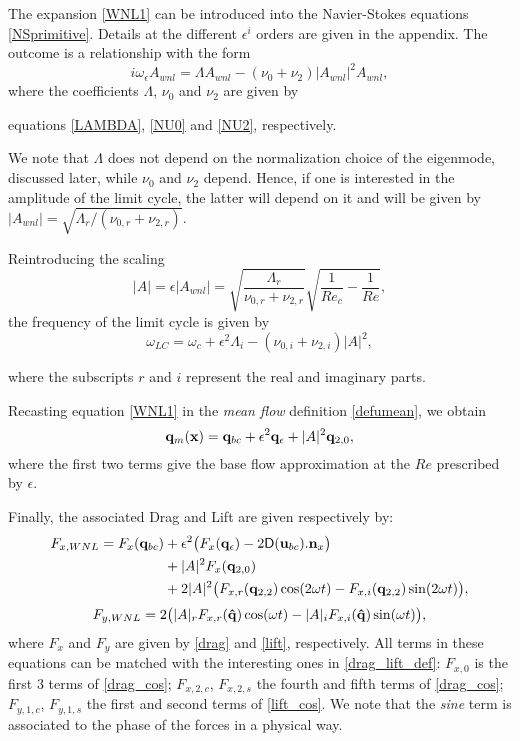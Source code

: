 \documentclass[twocolumn,10pt]{asme2ej}
\newcommand{\be}[1]{ \begin{equation} \label{#1}}
\newcommand{\ee}{\end{equation}}
\begin{document}
{\color{red}
The expansion \ref{WNL1} can be introduced into the Navier-Stokes equations \ref{NSprimitive}. Details at the different $\epsilon^i$ orders are given in the appendix}. The outcome is a relationship with the form
\be{WNL3}
i \omega_\epsilon A_{wnl} = \Lambda A_{wnl} - (\nu_0+\nu_2)  |A_{wnl}|^2 A_{wnl},
\ee
where the coefficients $\Lambda$, $\nu_0$ and $\nu_2$ are given by {\color{red}equations \ref{LAMBDA}, \ref{NU0} and \ref{NU2}, respectively.

We note that $\Lambda$ does not depend on the normalization choice of the eigenmode, discussed later, while $\nu_0$ and $\nu_2$ depend. Hence, if one is interested in the amplitude of the limit cycle, the latter will depend on it and will be given by $|A_{wnl}| = \sqrt{\Lambda_r/(\nu_{0,r}+\nu_{2,r})}$.

Reintroducing the scaling
\be{ANL} 
|A| =  \epsilon |A_{wnl}| =\sqrt{ \frac{\Lambda_r}{\nu_{0,r}+\nu_{2,r} }} \sqrt{\frac{1}{Re_c}-\frac{1}{Re}},
\ee
the frequency of the limit cycle is given by
\be{omegaWNL} 
\omega_{LC}=\omega_c+ \epsilon^2\Lambda_i- (\nu_{0,i}+\nu_{2,i})|A|^2,
\ee 

where the subscripts $r$ and $i$ represent the real and imaginary parts.
}
{\color{red}
Recasting equation \ref{WNL1} in the {\em mean flow} definition \ref{defumean}, we obtain
\be{mean_flow_WNL}
{\bf q}_m({\bf x })= {\bf q}_{bc}+\epsilon^2 {\bf q}_\epsilon + |A|^2{\bf q}_{2,0},
\ee
where the first two terms give the base flow approximation at the $Re$ prescribed by $\epsilon$. }

{\color{red} Finally, the associated Drag and Lift are given respectively by:
\be{drag_cos}
\begin{aligned}
F_{x,WNL} = F_{x}({\bf q}_{bc})&+\epsilon^2 \big( 
F_{x}({\bf q}_{\epsilon})- 2\mathsf{D}({\bf u}_{bc}).{\bf n}_x \big)\\
&+|A|^2 F_{x}({\bf q}_{2,0})\\
&+2|A|^2\big(F_{x,r}({\bf q}_{2,2})\cos(2\omega t)
-F_{x,i}({\bf q}_{2,2})\sin(2\omega t) \big),
\end{aligned}
\ee
\be{lift_cos}
\begin{aligned}
F_{y,WNL} =2\big(|A|_r F_{x,r}({\bf \hat{q}})\cos(\omega t)-
|A|_i F_{x,i}({\bf \hat{q}})\sin(\omega t) \big),\\
\end{aligned}
\ee
where $F_{x}$ and $F_{y}$ are given by \ref{drag} and \ref{lift}, respectively. All terms in these equations can be matched with the interesting ones in \ref{drag_lift_def}: $F_{x,0}$ is the first 3 terms of \ref{drag_cos}; $F_{x,2,c}$, $F_{x,2,s}$ the fourth and fifth terms of \ref{drag_cos}; $F_{y,1,c}$, $F_{y,1,s}$ the first and second terms of \ref{lift_cos}. We note that the \textit{sine} term is associated to the phase of the forces in a physical way. }
\end{document}

